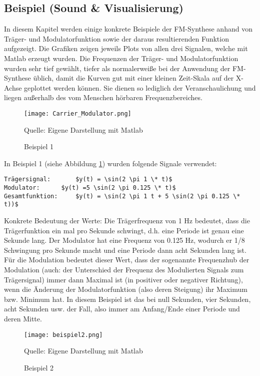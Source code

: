 \subsection{Beispiel (Sound \& Visualisierung)}
In diesem Kapitel werden einige konkrete Beispiele der FM-Synthese anhand von Träger- und Modulatorfunktion sowie der daraus resultierenden Funktion aufgezeigt. Die Grafiken zeigen jeweils Plots von allen drei Signalen, welche mit Matlab erzeugt wurden.
Die Frequenzen der Träger- und Modulatorfunktion wurden sehr tief gewählt, tiefer als normalerweiße bei der Anwendung der FM-Synthese üblich, damit die Kurven gut mit einer kleinen Zeit-Skala auf der X-Achse geplottet werden können. Sie dienen so lediglich der Veranschaulichung und liegen außerhalb des vom Menschen hörbaren Frequenzbereiches.

\begin{figure} [ht]
\centering
  \texttt{[image: Carrier\_Modulator.png]}
\caption{Beispiel 1}
\label{fig:beispiel1}
Quelle: Eigene Darstellung mit Matlab
\end{figure}

In Beispiel 1 (siehe Abbildung \ref{fig:beispiel1})  wurden folgende Signale verwendet:

\begin{lstlisting}[mathescape]
Trägersignal: 		$y(t) = \sin(2 \pi 1 \* t)$
Modulator:		$y(t) =5 \sin(2 \pi 0.125 \* t)$
Gesamtfunktion: 	$y(t) = \sin(2 \pi 1 t + 5 \sin(2 \pi 0.125 \* t))$
\end{lstlisting}

Konkrete Bedeutung der Werte: Die Trägerfrequenz von 1 Hz bedeutet, dass die Trägerfunktion ein mal pro Sekunde schwingt, d.h. eine Periode ist genau eine Sekunde lang. Der Modulator hat eine Frequenz von 0.125 Hz, wodurch er 1/8 Schwingung pro Sekunde macht und eine Periode dann acht Sekunden lang ist. Für die Modulation bedeutet dieser Wert, dass der sogenannte Frequenzhub der Modulation (auch: der Unterschied der Frequenz des Modulierten Signals zum Trägersignal) immer dann Maximal ist (in positiver oder negativer Richtung), wenn die Änderung der Modulatorfunktion (also deren Steigung) ihr Maximum bzw. Minimum hat. In diesem Beispiel ist das bei null Sekunden, vier Sekunden, acht Sekunden usw. der Fall, also immer am Anfang/Ende einer Periode und deren Mitte.

\begin{figure} [ht]
\centering
  \texttt{[image: beispiel2.png]}
\caption{Beispiel 2}
\label{fig:beispiel2}
Quelle: Eigene Darstellung mit Matlab
\end{figure}

